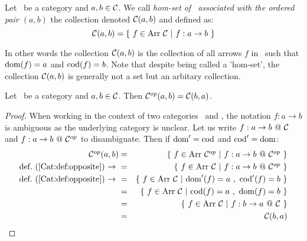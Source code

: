 \begin{defin}\label{Cat:def:homset}
    Let \Cat\ be a category and $a,b\in\mbox{$\cal C$}$. We call {\em hom-set of \Cat\ 
    associated with the ordered pair $(a,b)$} the collection denoted $\mbox{$\cal C$}(a,b)$ 
    and defined as:
        \[
            \Cat(a,b) = \{\ f\in\arr\ \Cat\ |\ f : a \to b\ \}
        \]
\end{defin}

\noindent
In other words the collection $\mbox{$\cal C$}(a,b)$ is the collection of all arrows $f$ in
\Cat\ such that $\mbox{\rm dom}(f)=a$ and $\mbox{\rm cod}(f)=b$. Note that despite being called a
'hom-set', the collection $\mbox{$\cal C$}(a,b)$ is generally not a set but an 
arbitary collection.

\begin{prop}\label{Cat:prop:homset:opposite}
    Let \Cat\ be a category and $a,b\in\mbox{$\cal C$}$. Then $\mbox{${\cal C}^{op}$}(a,b)=\mbox{$\cal C$}(b,a)$.
\end{prop}
\begin{proof}
    When working in the context of two categories \Cat\ and \Cop, the notation
    $f:a\to b$ is ambiguous as the underlying category is unclear. Let us
    write $f:a\to b\ @~\mbox{$\cal C$}$ and $f:a\to b\ @~\mbox{${\cal C}^{op}$}$ to disambiguate.
    Then if $\mbox{\rm dom}'=\mbox{\rm cod}$ and $\mbox{\rm cod}'=\mbox{\rm dom}$:
        \begin{eqnarray*}\Cop(a,b)
            &=&\{\ f\in\arr\ \Cop\ |\ f : a \to b\ @~\Cop\ \}\\
            \mbox{def.~(\ref{Cat:def:opposite})\ $\to$\ }
            &=&\{\ f\in\arr\ \Cat\ |\ f : a \to b\ @~\Cop\ \}\\
            \mbox{def.~(\ref{Cat:def:opposite})\ $\to$\ }
            &=&\{\ f\in\arr\ \Cat\ |\ \dom'(f)=a\ ,\ \cod'(f)=b\ \}\\
            &=&\{\ f\in\arr\ \Cat\ |\ \cod(f)=a\ ,\ \dom(f)=b\ \}\\
            &=&\{\ f\in\arr\ \Cat\ |\ f : b \to a\ @~\Cat\ \}\\
            &=&\Cat(b,a)
        \end{eqnarray*}
\end{proof}


